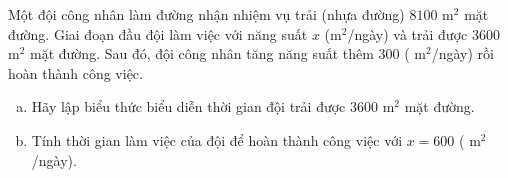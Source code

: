 \begin{bt}%
	Một đội công nhân làm đường nhận nhiệm vụ trải (nhựa đường) $8100$ m$^2$ mặt đường. Giai đoạn đầu đội làm việc với năng suất $x$ (m$^2$/ngày) và trải được $3600$ m$^2$ mặt đường. Sau đó, đội công nhân tăng năng suất thêm $300$ ( m$^2$/ngày) rồi hoàn thành công việc.
	\begin{enumerate}[a)]
		\item Hãy lập biểu thức biểu diễn thời gian đội trải được $3600$ m$^2$ mặt đường.
		\item Tính thời gian làm việc của đội để hoàn thành công việc với $x= 600$ ( m$^2$/ngày).
	\end{enumerate}
\end{bt}
